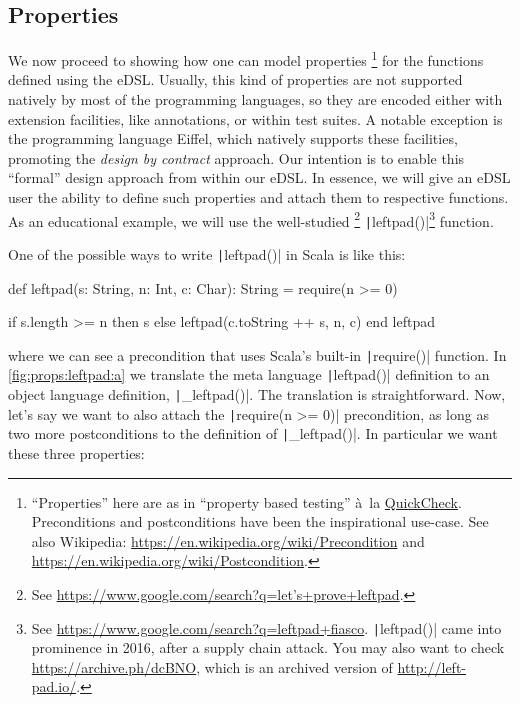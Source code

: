 \documentclass[11pt]{article}
\renewcommand{\vref}[1]{\autoref{#1} \vpageref{#1}}{}
\newcommand{\ScalaI}[1]{\texttt|#1|}
\newcommand{\TextI}[1]{\texttt|#1|}
\begin{document}
\subsection{Properties}
\label{sec:properties}
We now proceed to showing how one can model properties%
\footnote{``Properties'' here are as in ``property based testing'' à~la 
\href{https://en.wikipedia.org/wiki/QuickCheck}{QuickCheck}. Preconditions 
and postconditions have been the inspirational use-case. See also Wikipedia: 
\href{https://en.wikipedia.org/wiki/Precondition}{https://en.wikipedia.org/wiki/Precondition}
 and 
\href{https://en.wikipedia.org/wiki/Postcondition}{https://en.wikipedia.org/wiki/Postcondition}.}
 for the functions defined using the eDSL. Usually, this kind of properties 
are not supported natively by most of the programming languages, so they are 
encoded either with extension facilities, like annotations, or within test 
suites. A notable exception is the programming language Eiffel, which 
natively supports these facilities, promoting the \textit{design by contract} 
approach. Our intention is to enable this ``formal'' design approach from 
within our eDSL. In essence, we will give an eDSL user the ability to define 
such properties and attach them to respective functions. As an educational 
example, we will use the well-studied%
\footnote{See 
\href{https://www.google.com/search?q=let's+prove+leftpad}{https://www.google.com/search?q=let's+prove+leftpad}.}
 \TextI{leftpad()}\footnote{See 
\href{https://www.google.com/search?q=leftpad+fiasco}{https://www.google.com/search?q=leftpad+fiasco}.
 \TextI{leftpad()} came into prominence in 2016, after a supply chain attack. 
You may also want to check 
\href{https://archive.ph/dcBNO}{https://archive.ph/dcBNO}, which is an 
archived version of \href{http://left-pad.io/}{http://left-pad.io/}.} 
function.

One of the possible ways to write \ScalaI{leftpad()} in Scala is like this:

\begin{ScalaBlockSimple}
def leftpad(s: String, n: Int, c: Char): String =
  require(n >= 0)

  if s.length >= n then s else leftpad(c.toString ++ s, n, c)
end leftpad
\end{ScalaBlockSimple}

\noindent where we can see a precondition that uses Scala's built-in 
\ScalaI{require()} function. In \vref{fig:props:leftpad:a} we translate the 
meta language \ScalaI{leftpad()} definition to an object language definition, 
\ScalaI{_leftpad()}. The translation is straightforward.  Now, let's say we 
want to also attach the \ScalaI{require(n >= 0)} precondition, as long as two 
more postconditions to the definition of \ScalaI{_leftpad()}. In particular 
we want these three properties:
\end{document}
